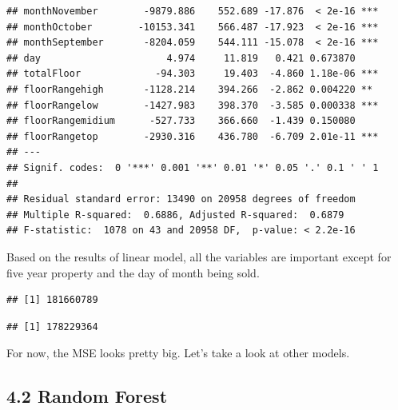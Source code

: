 \documentclass[
]{article}
\newenvironment{Shaded}{\begin{snugshade}}{\end{snugshade}}
\newcommand{\AttributeTok}[1]{\textcolor[rgb]{0.77,0.63,0.00}{#1}}
\newcommand{\CommentTok}[1]{\textcolor[rgb]{0.56,0.35,0.01}{\textit{#1}}}
\newcommand{\DecValTok}[1]{\textcolor[rgb]{0.00,0.00,0.81}{#1}}
\newcommand{\FunctionTok}[1]{\textcolor[rgb]{0.00,0.00,0.00}{#1}}
\newcommand{\NormalTok}[1]{#1}
\newcommand{\OtherTok}[1]{\textcolor[rgb]{0.56,0.35,0.01}{#1}}
\newcommand{\SpecialCharTok}[1]{\textcolor[rgb]{0.00,0.00,0.00}{#1}}
\newcommand{\StringTok}[1]{\textcolor[rgb]{0.31,0.60,0.02}{#1}}
\begin{document}
\begin{verbatim}
## monthNovember        -9879.886    552.689 -17.876  < 2e-16 ***
## monthOctober        -10153.341    566.487 -17.923  < 2e-16 ***
## monthSeptember       -8204.059    544.111 -15.078  < 2e-16 ***
## day                      4.974     11.819   0.421 0.673870    
## totalFloor             -94.303     19.403  -4.860 1.18e-06 ***
## floorRangehigh       -1128.214    394.266  -2.862 0.004220 ** 
## floorRangelow        -1427.983    398.370  -3.585 0.000338 ***
## floorRangemidium      -527.733    366.660  -1.439 0.150080    
## floorRangetop        -2930.316    436.780  -6.709 2.01e-11 ***
## ---
## Signif. codes:  0 '***' 0.001 '**' 0.01 '*' 0.05 '.' 0.1 ' ' 1
## 
## Residual standard error: 13490 on 20958 degrees of freedom
## Multiple R-squared:  0.6886, Adjusted R-squared:  0.6879 
## F-statistic:  1078 on 43 and 20958 DF,  p-value: < 2.2e-16
\end{verbatim}

Based on the results of linear model, all the variables are important
except for five year property and the day of month being sold.

\begin{Shaded}
\end{Shaded}

\begin{verbatim}
## [1] 181660789
\end{verbatim}

\begin{Shaded}
\end{Shaded}

\begin{verbatim}
## [1] 178229364
\end{verbatim}

For now, the MSE looks pretty big. Let's take a look at other models.

\hypertarget{random-forest}{%
\subsection{4.2 Random Forest}\label{random-forest}}
\end{document}
